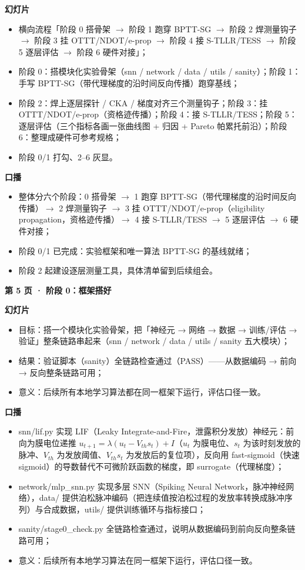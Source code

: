 \documentclass[journal,12pt,onecolumn]{IEEEtran}
\begin{document}
\textbf{幻灯片}
\begin{itemize}[leftmargin=1.5em,itemsep=0pt]
\item 横向流程「阶段 0 搭骨架 $\to$ 阶段 1 跑穿 BPTT-SG $\to$ 阶段 2 焊测量钩子 $\to$ 阶段 3 挂 OTTT/NDOT/e-prop $\to$ 阶段 4 接 S-TLLR/TESS $\to$ 阶段 5 逐层评估 $\to$ 阶段 6 硬件对接」；
\item 阶段 0：搭模块化实验骨架（snn / network / data / utils / sanity）；阶段 1：手写 BPTT-SG（带代理梯度的沿时间反向传播）跑穿基线；
\item 阶段 2：焊上逐层探针 / CKA / 梯度对齐三个测量钩子；阶段 3：挂 OTTT/NDOT/e-prop（资格迹传播）；阶段 4：接 S-TLLR/TESS；阶段 5：逐层评估（三个指标各画一张曲线图 + 归因 + Pareto 帕累托前沿）；阶段 6：整理成硬件可参考规格；
\item 阶段 0/1 打勾、2--6 灰显。
\end{itemize}

\textbf{口播}
\begin{itemize}[leftmargin=1.5em,itemsep=0pt]
\item 整体分六个阶段：0 搭骨架 $\to$ 1 跑穿 BPTT-SG（带代理梯度的沿时间反向传播）$\to$ 2 焊测量钩子 $\to$ 3 挂 OTTT/NDOT/e-prop（eligibility propagation，资格迹传播）$\to$ 4 接 S-TLLR/TESS $\to$ 5 逐层评估 $\to$ 6 硬件对接；
\item 阶段 0/1 已完成：实验框架和唯一算法 BPTT-SG 的基线就绪；
\item 阶段 2 起建设逐层测量工具，具体清单留到后续组会。
\end{itemize}

\textbf{第 5 页 · 阶段 0：框架搭好}

\textbf{幻灯片}
\begin{itemize}[leftmargin=1.5em,itemsep=0pt]
\item 目标：搭一个模块化实验骨架，把「神经元 → 网络 → 数据 → 训练/评估 → 验证」整条链路串起来（snn / network / data / utils / sanity 五大模块）；
\item 结果：验证脚本（sanity）全链路检查通过（PASS）——从数据编码 → 前向 → 反向整条链路可用；
\item 意义：后续所有本地学习算法都在同一框架下运行，评估口径一致。
\end{itemize}

\textbf{口播}
\begin{itemize}[leftmargin=1.5em,itemsep=0pt]
\item snn/lif.py 实现 LIF（Leaky Integrate-and-Fire，泄露积分发放）神经元：前向为膜电位递推 $u_{t+1}=\lambda(u_t-V_{th}s_t)+I$（$u_t$ 为膜电位、$s_t$ 为该时刻发放的脉冲、$V_{th}$ 为发放阈值、$V_{th}s_t$ 为发放后的复位项），反向用 fast-sigmoid（快速 sigmoid）的导数替代不可微阶跃函数的梯度，即 surrogate（代理梯度）；
\item network/mlp\_snn.py 实现多层 SNN（Spiking Neural Network，脉冲神经网络），data/ 提供泊松脉冲编码（把连续值按泊松过程的发放率转换成脉冲序列）与合成数据，utils/ 提供训练循环与指标接口；
\item sanity/stage0\_check.py 全链路检查通过，说明从数据编码到前向反向整条链路可用；
\item 意义：后续所有本地学习算法在同一框架下运行，评估口径一致。
\end{itemize}
\end{document}
